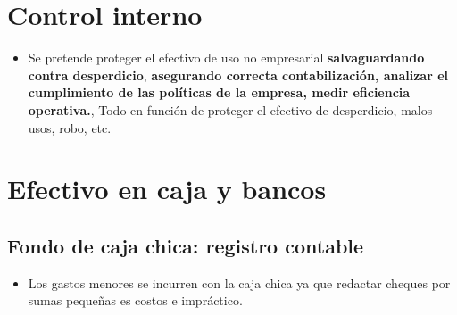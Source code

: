 \documentclass{article}
\begin{document}
\section{Control interno}
\begin{itemize}
    \item Se pretende proteger el efectivo de uso no empresarial \textbf{salvaguardando contra desperdicio}, \textbf{asegurando correcta contabilización, analizar el cumplimiento de las políticas de la empresa, medir eficiencia operativa.}, Todo en función de proteger el efectivo de desperdicio, malos usos, robo, etc.
\end{itemize}

\section{Efectivo en caja y bancos}
\subsection{Fondo de caja chica: registro contable}
\begin{itemize}
    \item Los gastos menores se incurren con la caja chica ya que redactar cheques por sumas pequeñas es costos e impráctico.
\end{itemize}
\end{document}
